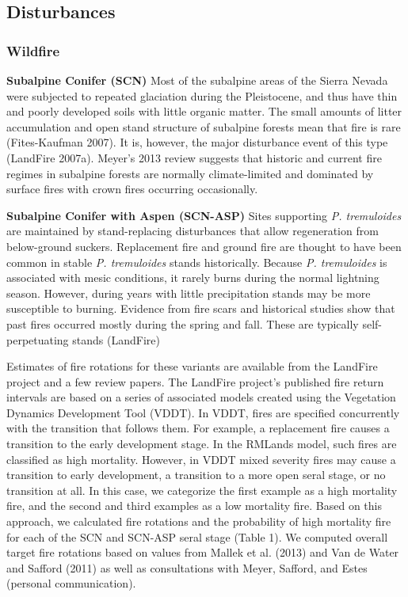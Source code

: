 \subsection*{Disturbances}

\subsubsection{Wildfire}
\textbf{Subalpine Conifer (SCN)} Most of the subalpine areas of the Sierra Nevada were subjected to repeated glaciation during the Pleistocene, and thus have thin and poorly developed soils with little organic matter. The small amounts of litter accumulation and open stand structure of subalpine forests mean that fire is rare (Fites-Kaufman 2007). It is, however, the major disturbance event of this type (LandFire 2007a). Meyer’s 2013 review suggests that historic and current fire regimes in subalpine forests are normally climate-limited and dominated by surface fires with crown fires occurring occasionally.  

\textbf{Subalpine Conifer with Aspen (SCN-ASP)} Sites supporting \emph{P. tremuloides} are maintained by stand-replacing disturbances that allow regeneration from below-ground suckers. Replacement fire and ground fire are thought to have been common in stable \emph{P. tremuloides} stands historically. Because \emph{P. tremuloides} is associated with mesic conditions, it rarely burns during the normal lightning season. However, during years with little precipitation stands may be more susceptible to burning. Evidence from fire scars and historical studies show that past fires occurred mostly during the spring and fall. These are typically self-perpetuating stands (LandFire)

Estimates of fire rotations for these variants are available from the LandFire project and a few review papers. The LandFire project’s published fire return intervals are based on a series of associated models created using the Vegetation Dynamics Development Tool (VDDT). In VDDT, fires are specified concurrently with the transition that follows them. For example, a replacement fire causes a transition to the early development stage. In the RMLands model, such fires are classified as high mortality. However, in VDDT mixed severity fires may cause a transition to early development, a transition to a more open seral stage, or no transition at all. In this case, we categorize the first example as a high mortality fire, and the second and third examples as a low mortality fire. Based on this approach, we calculated fire rotations and the probability of high mortality fire for each of the SCN and SCN-ASP seral stage (Table 1). We computed overall target fire rotations based on values from Mallek et al. (2013) and Van de Water and Safford (2011) as well as consultations with Meyer, Safford, and Estes (personal communication). 





